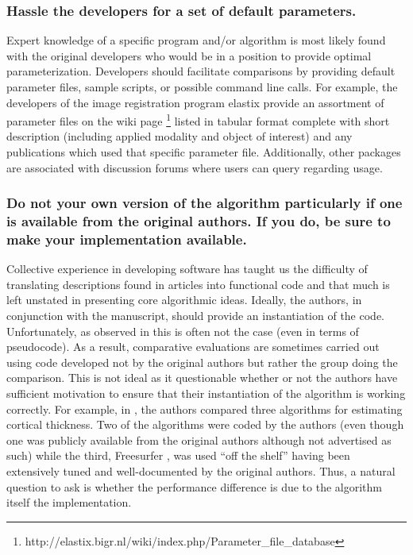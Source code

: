 \documentclass[final,5p,times,twocolumn]{elsarticle}
\begin{document}
\subsubsection{Hassle the developers for a set of default parameters.}
Expert knowledge of a specific program and/or algorithm is most
likely found with the original developers who would be in a position to
provide optimal parameterization.
Developers should  facilitate
comparisons by providing default parameter files, sample scripts, 
or possible command line calls.  For example, the developers of
the image registration program elastix \cite{klein2010} provide an
assortment of parameter files on the wiki page%
\footnote{
  http://elastix.bigr.nl/wiki/index.php/Parameter\_file\_database
}
listed in tabular format complete with  short
description (including applied modality and object of interest) and 
any publications which used that specific parameter file.  Additionally,
other packages are associated with discussion forums where users can
query regarding usage.

\subsubsection{Do not  your own version of the algorithm particularly 
if one is available from the original authors.  If you do, be sure to make
your implementation available.}

Collective experience in developing software has taught us the 
difficulty of translating descriptions found in
articles into functional code and that much is left unstated
in presenting core algorithmic ideas.  Ideally, the authors,
in conjunction with the manuscript, should provide an instantiation
of the code.  Unfortunately, as observed in \cite{kovacevic2006}
this is often not the case (even in terms of pseudocode).
As a result, comparative evaluations are sometimes carried out using 
code developed not by the original authors but rather the 
group doing the comparison.  This is not ideal as it  questionable
whether or not the authors have sufficient motivation to ensure that
their instantiation of the algorithm is working correctly. For
example, in \cite{clarkson2011}, the authors compared three algorithms
for estimating cortical thickness.  Two of the algorithms were
coded by the authors (even though one was publicly available from 
the original authors although not advertised as such) while the third, 
Freesurfer \cite{fischl2012}, was used ``off the shelf'' having been extensively 
tuned and well-documented by the original authors.  
Thus, a natural question to ask is whether the performance difference
is due to the algorithm itself\added[id=tr]{,}  the implementation.
\end{document}
